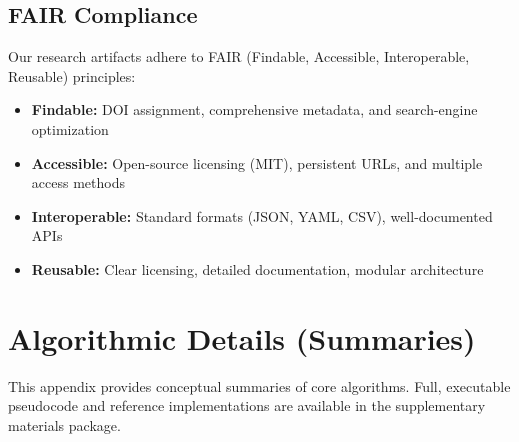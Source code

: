 \documentclass[sigconf,natbib]{acmart}
\begin{document}
\subsection{FAIR Compliance}
Our research artifacts adhere to FAIR (Findable, Accessible, Interoperable, Reusable) principles:
\begin{itemize}
    \item \textbf{Findable:} DOI assignment, comprehensive metadata, and search-engine optimization
    \item \textbf{Accessible:} Open-source licensing (MIT), persistent URLs, and multiple access methods
    \item \textbf{Interoperable:} Standard formats (JSON, YAML, CSV), well-documented APIs
    \item \textbf{Reusable:} Clear licensing, detailed documentation, modular architecture
\end{itemize}

\section{Algorithmic Details (Summaries)}
\label{app:algorithmic_details}
This appendix provides conceptual summaries of core algorithms. Full, executable pseudocode and reference implementations are available in the supplementary materials package.
\end{document}
